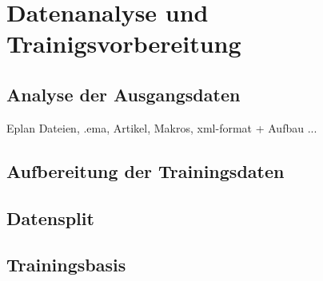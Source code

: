 ﻿\chapter{Datenanalyse und Trainigsvorbereitung}\label{chap:datenanalyse_und_trainingsvorbereitung}

\section{Analyse der Ausgangsdaten}

Eplan Dateien, .ema, Artikel, Makros, xml-format + Aufbau ...

\section{Aufbereitung der Trainingsdaten}

\section{Datensplit}

\section{Trainingsbasis}




